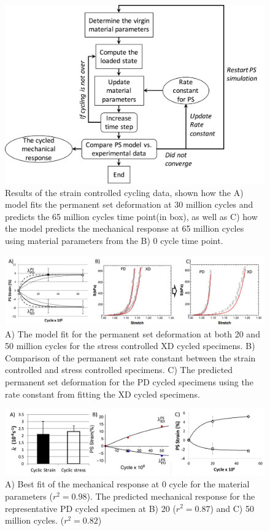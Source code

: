 \begin{figure}[hbt]
\centering
\centerline{\includegraphics[width=0.75\paperwidth]{Images/chapter4/figure13}}
\caption{Results of the strain controlled cycling data, shown how the A) model fits the permanent set deformation at 30 million cycles and predicts the 65 million cycles time point(in box), as well as C) how the model predicts the mechanical response at 65 million cycles using material parameters from the B) 0 cycle time point.}
\label{fig:strainresults}
\end{figure}
\begin{figure}[hbt]
\centering
\centerline{\includegraphics[width=0.75\paperwidth]{Images/chapter4/figure14}}
\caption{A) The model fit for the permanent set deformation at both 20 and 50 million cycles for the stress controlled XD cycled specimens. B) Comparison of the permanent set rate constant between the strain controlled and stress controlled specimens. C) The predicted permanent set deformation for the PD cycled specimens using the rate constant from fitting the XD cycled specimens. }
\label{fig:stressXDdef}
\end{figure}
\begin{figure}[hbt]
\centering
\centerline{\includegraphics[width=0.75\paperwidth]{Images/chapter4/figure15}}
\caption{A) Best fit of the mechanical response at 0 cycle for the material parameters ($r^2 = 0.98$). The predicted mechanical response for the representative PD cycled specimen at B) 20 ($r^2 = 0.87$) and C) 50 million cycles. ($r^2 = 0.82$)}
\label{fig:stressPDmech}
\end{figure}

